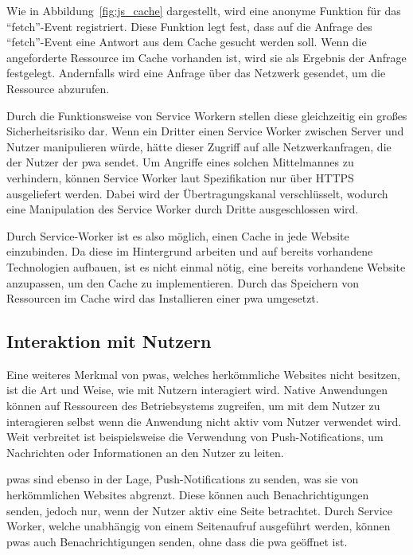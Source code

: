 \documentclass[12pt, parskip=half]{scrartcl}       %
\begin{document}
Wie in Abbildung~\ref{fig:js_cache} dargestellt, wird eine anonyme Funktion für das \enquote{fetch}-Event registriert.
Diese Funktion legt fest, dass auf die Anfrage des \enquote{fetch}-Event eine Antwort aus dem Cache gesucht werden soll.
Wenn die angeforderte Ressource im Cache vorhanden ist, wird sie als Ergebnis der Anfrage festgelegt.
Andernfalls wird eine Anfrage über das Netzwerk gesendet, um die Ressource abzurufen.

Durch die Funktionsweise von Service Workern stellen diese gleichzeitig ein großes Sicherheitsrisiko dar.
Wenn ein Dritter einen Service Worker zwischen Server und Nutzer manipulieren würde, hätte dieser Zugriff auf alle Netzwerkanfragen, die der Nutzer der \ac{pwa} sendet.
Um Angriffe eines solchen Mittelmannes zu verhindern, können Service Worker laut Spezifikation nur über HTTPS ausgeliefert werden.
Dabei wird der Übertragungskanal verschlüsselt, wodurch eine Manipulation des Service Worker durch Dritte ausgeschlossen wird.

Durch Service-Worker ist es also möglich, einen Cache in jede Website einzubinden.
Da diese im Hintergrund arbeiten und auf bereits vorhandene Technologien aufbauen, ist es nicht einmal nötig, eine bereits vorhandene Website anzupassen, um den Cache zu implementieren.
Durch das Speichern von Ressourcen im Cache wird das Installieren einer \ac{pwa} umgesetzt.

\subsection{Interaktion mit Nutzern}

Eine weiteres Merkmal von \acp{pwa}, welches herkömmliche Websites nicht besitzen, ist die Art und Weise, wie mit Nutzern interagiert wird.
Native Anwendungen können auf Ressourcen des Betriebsystems zugreifen, um mit dem Nutzer zu interagieren selbst wenn die Anwendung nicht aktiv vom Nutzer verwendet wird.
Weit verbreitet ist beispielsweise die Verwendung von Push-Notifications\cite{businessofapps_pushnotificationstatistics}, um Nachrichten oder Informationen an den Nutzer zu leiten.

\acp{pwa} sind ebenso in der Lage, Push-Notifications zu senden, was sie von herkömmlichen Websites abgrenzt.
Diese können auch Benachrichtigungen senden, jedoch nur, wenn der Nutzer aktiv eine Seite betrachtet.
Durch Service Worker, welche unabhängig von einem Seitenaufruf ausgeführt werden, können \acp{pwa} auch Benachrichtigungen senden, ohne dass die \ac{pwa} geöffnet ist\cite{ejaz_progressive_pushnotifications}.
\end{document}
